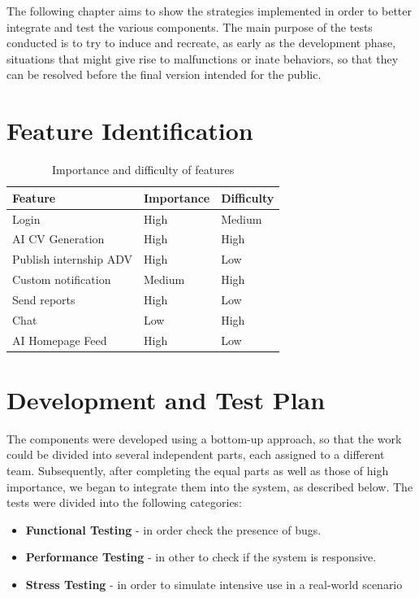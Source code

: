 
The following chapter aims to show the strategies implemented in order to better integrate and test the various components. The main purpose of the tests conducted is to try to induce and recreate, as early as the development phase, situations that might give rise to malfunctions or inate behaviors, so that they can be resolved before the final version intended for the public.


\section{Feature Identification}

\begin{table}[H]
    \centering
    \begin{tabular}{|l|l|l|}
        \hline
        \textbf{Feature}                    & \textbf{Importance} & \textbf{Difficulty} \\\hline
        Login                               & High                & Medium              \\
        AI CV Generation   & High                & High                 \\
        Publish internship ADV & High                & Low              \\
        Custom notification & Medium                & High                \\
        Send reports        & High                & Low                 \\
        Chat                & Low              & High                 \\
        AI Homepage Feed    & High              & Low               \\\hline
    \end{tabular}
    \caption{Importance and difficulty of features}
    \label{table:Importance and difficulty of features}
\end{table}

\section{Development and Test Plan}
The components were developed using a bottom-up approach, so that the work could be divided into several independent parts, each assigned to a different team. Subsequently, after completing the equal parts as well as those of high importance, we began to integrate them into the system, as described below.
The tests were divided into the following categories: 
\begin{itemize}
    \item \textbf{Functional Testing} - in order check the presence of bugs.
    \item \textbf{Performance Testing} - in other to check if the system is responsive.
    \item \textbf{Stress Testing} - in order to simulate intensive use in a real-world scenario
\end{itemize}

